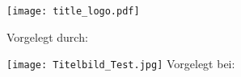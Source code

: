 \begin{titlepage}
  \centering
 \texttt{[image: title\_logo.pdf]}\\[.25cm]
  {\scshape\paperinstitution\par}
  \vspace{1cm}
  {\scshape\Large\papertype\par}
  \vspace{1.5cm}
  {\huge\bfseries\papertitle\par}
  \vspace{2cm}
  {\Large Vorgelegt durch:\par\paperauthor\par}
  \vfill
  \texttt{[image: Titelbild\_Test.jpg]} %
  \vfill
  Vorgelegt bei:\par
  {\sc\papersupervisor\par}
  \vspace{1cm}
  {\large\paperdate\par}
\end{titlepage}
